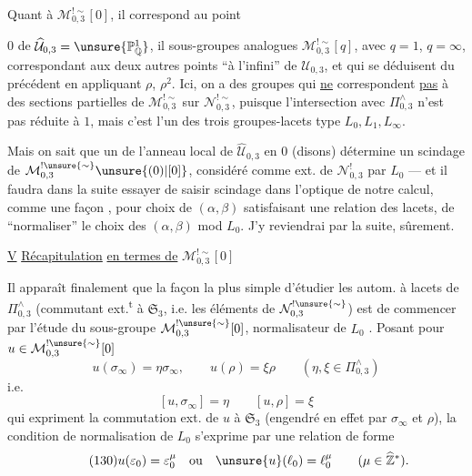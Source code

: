 Quant à $\mathcal M_{0,3}^{!\sim}[0]$, il correspond
 au point


$0$ de $\widehat{\mathcal U}_{0,3}=\unsure{\mathbb P^1_{\mathbb Q}}$,
il 
sous-groupes analogues $\mathcal M_{0,3}^{!\sim}[q]$, avec
$q=1$, $q=\infty$, correspondant aux deux autres points ``à l'infini''
de $\mathcal U_{0,3}$, et qui se déduisent du précédent en appliquant
$\rho$, $\rho^2$.
Ici, on a des groupes qui \uline{ne} correspondent \uline{pas}
 à des sections  partielles
de $\mathcal M_{0,3}^{!\sim}$ sur $\mathcal N_{0,3}^{!\sim}$,
puisque l'intersection avec $\Pi_{0,3}^{\wedge}$ n'est pas réduite à $1$,
mais c'est l'un des trois groupes-lacets type $L_0,L_1,L_\infty$.

Mais on sait que un 
de l'anneau local de $\widehat{\mathcal U}_{0,3}$ en $0$ (disons)
détermine un scindage de
$\mathcal M_{0,3}^{!\unsure{\sim}}\unsure{(0)|[0]}$, considéré comme
ext. de $\mathcal N_{0,3}^{!}$ par $L_0$ --- et il faudra
dans la suite essayer de saisir 
scindage 
dans l'optique de notre calcul, comme une façon 
, pour 
\deleted{$\alpha,\beta$} choix  de $(\alpha,\beta)$
satisfaisant une relation des lacets, de ``normaliser'' le choix des
$(\alpha,\beta)$ mod $L_0$.
J'y reviendrai par la suite, sûrement.


\uline{V} \uline{Récapitulation} \uline{en termes de}
$\mathcal M_{0,3}^{!\sim}[0]$

Il apparaît finalement que la façon la plus simple d'étudier les autom.
à lacets de $\Pi_{0,3}^{\wedge}$ (commutant ext.\textsuperscript{t}
à $\mathfrak S_3$, i.e. les éléments de 
$\mathcal N_{0,3}^{!\unsure{\sim}}$) est de commencer par l'étude du
sous-groupe $\mathcal M_{0,3}^{!\unsure{\sim}}[0]$, normalisateur
de $L_0$ .
Posant pour $u\in\mathcal M_{0,3}^{!\unsure{\sim}}[0]$
\[
\tag{128}
u(\sigma_\infty)=\eta\sigma_\infty,
\qquad u(\rho)=\xi\rho
\qquad(\eta,\xi\in\Pi_{0,3}^{\wedge})
\]
i.e.
\[
\tag{129}
[u,\sigma_\infty]=\eta\qquad [u,\rho]=\xi
\]
qui expriment la commutation ext. de $u$ à $\mathfrak S_3$
(engendré en effet par $\sigma_\infty$ et $\rho$), la condition de
normalisation de $L_0$ s'exprime par une relation de forme
\[
\tag{130}
u(\varepsilon_0)=\varepsilon_0^\mu
\quad\text{ou}\quad \unsure{u}(\ell_0)=\ell_0^\mu
\qquad(\mu\in\widehat{\mathbb Z}^{*}).
\]

